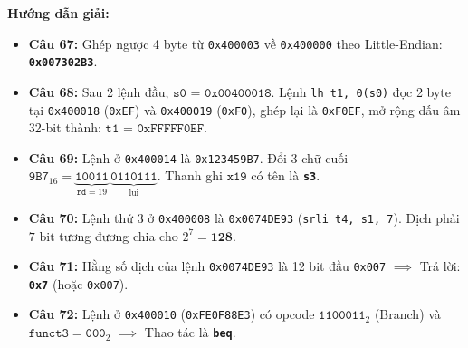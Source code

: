 \textbf{Hướng dẫn giải:}
\begin{itemize}
    \item \textbf{Câu 67:} Ghép ngược 4 byte từ \texttt{0x400003} về \texttt{0x400000} theo Little-Endian: \textbf{\texttt{0x007302B3}}.
    \item \textbf{Câu 68:} Sau 2 lệnh đầu, $\mathbf{\texttt{s0 = 0x00400018}}$. Lệnh \texttt{lh t1, 0(s0)} đọc 2 byte tại \texttt{0x400018} (\texttt{0xEF}) và \texttt{0x400019} (\texttt{0xF0}), ghép lại là \texttt{0xF0EF}, mở rộng dấu âm 32-bit thành: $\mathbf{\texttt{t1 = 0xFFFFF0EF}}$.
    \item \textbf{Câu 69:} Lệnh ở \texttt{0x400014} là \texttt{0x123459B7}. Đổi 3 chữ cuối $\texttt{9B7}_{16} = \underbrace{\texttt{10011}}_{\texttt{rd}=19}\,\underbrace{\texttt{0110111}}_{\text{lui}}$. Thanh ghi $\texttt{x19}$ có tên là \textbf{\texttt{s3}}.
    \item \textbf{Câu 70:} Lệnh thứ 3 ở \texttt{0x400008} là \texttt{0x0074DE93} (\texttt{srli t4, s1, 7}). Dịch phải $7\text{ bit}$ tương đương chia cho $2^7 = \mathbf{128}$.
    \item \textbf{Câu 71:} Hằng số dịch của lệnh \texttt{0x0074DE93} là 12 bit đầu \texttt{0x007} $\implies$ Trả lời: \textbf{\texttt{0x7}} (hoặc \texttt{0x007}).
    \item \textbf{Câu 72:} Lệnh ở \texttt{0x400010} (\texttt{0xFE0F88E3}) có opcode $\texttt{1100011}_2$ (Branch) và $\texttt{funct3} = \texttt{000}_2$ $\implies$ Thao tác là \textbf{\texttt{beq}}.
\end{itemize}

